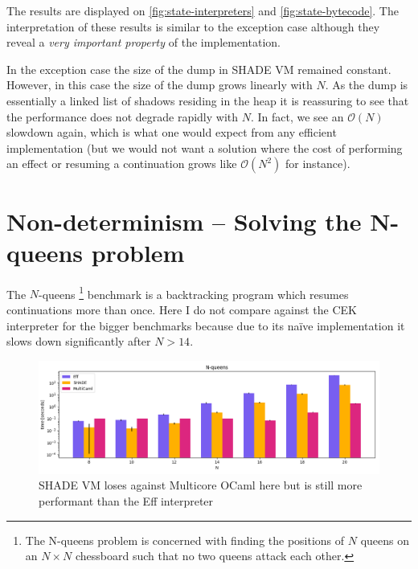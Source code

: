 \documentclass[class=article, crop=false]{standalone}
\begin{document}
The results are displayed on \autoref{fig:state-interpreters} and
\autoref{fig:state-bytecode}. The interpretation of these results is similar to
the exception case although they reveal a \emph{very important property} of the implementation.

In the exception case the size of the dump in SHADE VM remained constant.
However, in this case the size of the dump grows
linearly with $N$. As the dump is essentially a linked list of shadows residing
in the heap it is reassuring to see that the performance does not degrade
rapidly with $N$. In fact, we see an $\mathcal{O}(N)$ slowdown again, which is
what one would expect from any efficient implementation (but we would not want a
solution where the cost of performing an effect or resuming a continuation grows
like $\mathcal{O}(N^2)$ for instance).

\section{Non-determinism -- Solving the N-queens problem}

The $N$-queens%
\footnote{The N-queens problem is concerned with finding the positions of $N$
queens on an $N \times N$ chessboard such that no two queens attack each other.}
benchmark is a backtracking program which resumes continuations more than once.
Here I do not compare against the CEK interpreter for the bigger benchmarks
because due to its naïve implementation it slows down significantly after
$N > 14$. 

\begin{figure}
    \centering
    \includegraphics[width=.9\linewidth]{eval_plots/comp_queens.png}
    \caption[N-queens benchmark]{SHADE VM loses against Multicore OCaml here but is still more
    performant than the Eff interpreter}
    \label{fig:n-queens}
\end{figure}
\end{document}
